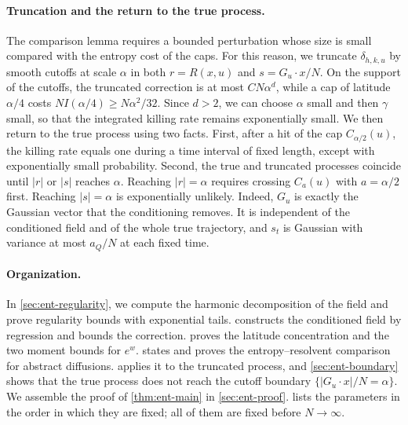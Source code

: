 \paragraph{Truncation and the return to the true process.}
The comparison lemma requires a bounded perturbation whose size is small
compared with the entropy cost of the caps. For this reason, we truncate
$\delta_{h,k,u}$ by smooth cutoffs at scale $\alpha$ in both $r=R(x,u)$ and
$s=G_u\cdot x/N$. On the support of the cutoffs, the truncated correction is
at most $CN\alpha^d$, while a cap of latitude $\alpha/4$ costs
$NI(\alpha/4)\ge N\alpha^2/32$. Since $d>2$, we can choose $\alpha$ small and
then $\gamma$ small, so that the integrated killing rate remains exponentially
small. We then return to the true process using two facts. First, after a hit
of the cap $C_{\alpha/2}(u)$, the killing rate equals one during a time
interval of fixed length, except with exponentially small probability. Second, the true and
truncated processes coincide until $|r|$ or $|s|$ reaches $\alpha$. Reaching
$|r|=\alpha$ requires crossing $C_a(u)$ with $a=\alpha/2$ first. Reaching
$|s|=\alpha$ is exponentially unlikely. Indeed, $G_u$ is
exactly the Gaussian vector that the conditioning removes. It is independent
of the conditioned field and of the whole true trajectory, and $s_t$ is
Gaussian with variance at most $a_Q/N$ at each fixed time.

\paragraph{Organization.}
In \cref{sec:ent-regularity}, we compute the harmonic decomposition of the
field and prove regularity bounds with exponential tails.
 constructs the conditioned field by regression and
bounds the correction.  proves the latitude
concentration and the two moment bounds for $e^w$. 
states and proves the entropy--resolvent comparison for abstract diffusions.
 applies it to the truncated process, and
\cref{sec:ent-boundary} shows that the true process does not reach the
cutoff boundary $\{|G_u\cdot x|/N=\alpha\}$. We assemble the
proof of \cref{thm:ent-main} in \cref{sec:ent-proof}.
 lists the parameters in the order in which they
are fixed; all of them are fixed before $N\to\infty$.

